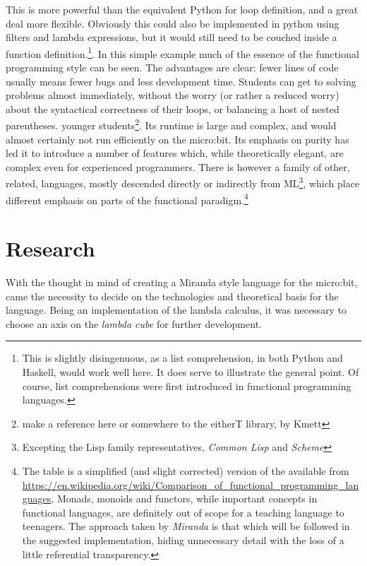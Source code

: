 \documentclass[12pt, a4paper]{report}
\begin{document}
This is more powerful than the equivalent Python for loop definition, and a great deal more
flexible. Obviously this could also be implemented in python using filters and lambda expressions,
but it would still need to be couched inside a function definition.\footnote{This is slightly
disingenuous, as a list comprehension, in both Python and Haskell, would work well here. It does
serve to illustrate the general point. Of course, list comprehensions were first introduced in
functional programming languages.}. In this simple example much of the essence of the functional
programming style can be seen. The advantages are clear: fewer lines of code usually means fewer
bugs and less development time. Students can get to solving problems almost immediately, without the
worry (or rather a reduced worry) about the syntactical correctness of their loops, or balancing
a host of nested parentheses. %
younger students\footnote{make a reference here or somewhere to the eitherT library, by Kmett}.
Its runtime is large and complex, and would almost certainly not run efficiently on the micro:bit.
Its emphasis on purity has led it to introduce a number of features which, while theoretically
elegant, are complex even for experienced programmers. There is however a family of other, related,
languages, mostly descended directly or indirectly from ML\footnote{Excepting the Lisp family
representatives, \textit{Common Lisp} and \textit{Scheme}}, which place different emphasis on parts
of the functional paradigm.\footnote{The table is a simplified (and slight corrected) version of the
available from \url{https://en.wikipedia.org/wiki/Comparison_of_functional_programming_languages}.
Monads, monoids and functors, while important concepts in functional languages, are definitely out
of scope for a teaching language to teenagers. The approach taken by \textit{Miranda} is that which
will be followed in the suggested implementation, hiding unnecessary detail with the loss of a
little referential transparency.}

\section{Research}
With the thought in mind of creating a Miranda style language for the micro:bit, came the necessity
to decide on the technologies and theoretical basis for the language. Being an implementation of the
lambda calculus, it was necessary to choose an axis on the \textit{lambda cube} for further
development. 
\end{document}
